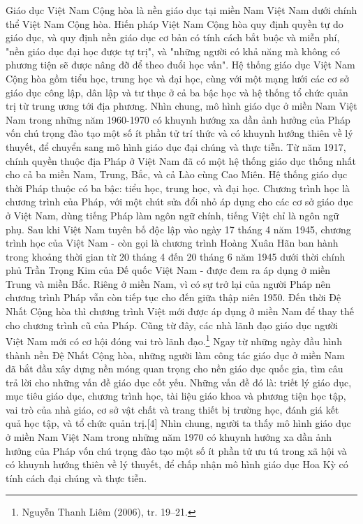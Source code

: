 \documentclass[../thesis.tex]{subfiles}
\begin{document}
Giáo dục Việt Nam Cộng hòa là nền giáo dục tại miền Nam Việt Nam dưới chính thể Việt Nam Cộng hòa.
Hiến pháp Việt Nam Cộng hòa quy định quyền tự do giáo dục, và quy định nền giáo dục cơ bản có tính cách bắt buộc và miễn phí, "nền giáo dục đại học được tự trị", và "những người có khả năng mà không có phương tiện sẽ được nâng đỡ để theo đuổi học vấn". Hệ thống giáo dục Việt Nam Cộng hòa gồm tiểu học, trung học và đại học, cùng với một mạng lưới các cơ sở giáo dục công lập, dân lập và tư thục ở cả ba bậc học và hệ thống tổ chức quản trị từ trung ương tới địa phương.
Nhìn chung, mô hình giáo dục ở miền Nam Việt Nam trong những năm 1960-1970 có khuynh hướng xa dần ảnh hưởng của Pháp vốn chú trọng đào tạo một số ít phần tử trí thức và có khuynh hướng thiên về lý thuyết, để chuyển sang mô hình giáo dục đại chúng và thực tiễn.
Từ năm 1917, chính quyền thuộc địa Pháp ở Việt Nam đã có một hệ thống giáo dục thống nhất cho cả ba miền Nam, Trung, Bắc, và cả Lào cùng Cao Miên. Hệ thống giáo dục thời Pháp thuộc có ba bậc: tiểu học, trung học, và đại học. Chương trình học là chương trình của Pháp, với một chút sửa đổi nhỏ áp dụng cho các cơ sở giáo dục ở Việt Nam, dùng tiếng Pháp làm ngôn ngữ chính, tiếng Việt chỉ là ngôn ngữ phụ. Sau khi Việt Nam tuyên bố độc lập vào ngày 17 tháng 4 năm 1945, chương trình học của Việt Nam - còn gọi là chương trình Hoàng Xuân Hãn ban hành trong khoảng thời gian từ 20 tháng 4 đến 20 tháng 6 năm 1945 dưới thời chính phủ Trần Trọng Kim của Đế quốc Việt Nam - được đem ra áp dụng ở miền Trung và miền Bắc. Riêng ở miền Nam, vì có sự trở lại của người Pháp nên chương trình Pháp vẫn còn tiếp tục cho đến giữa thập niên 1950. Đến thời Đệ Nhất Cộng hòa thì chương trình Việt mới được áp dụng ở miền Nam để thay thế cho chương trình cũ của Pháp. Cũng từ đây, các nhà lãnh đạo giáo dục người Việt Nam mới có cơ hội đóng vai trò lãnh đạo.\footnote{Nguyễn Thanh Liêm (2006), tr. 19–21.}
Ngay từ những ngày đầu hình thành nền Đệ Nhất Cộng hòa, những người làm công tác giáo dục ở miền Nam đã bắt đầu xây dựng nền móng quan trọng cho nền giáo dục quốc gia, tìm câu trả lời cho những vấn đề giáo dục cốt yếu. Những vấn đề đó là: triết lý giáo dục, mục tiêu giáo dục, chương trình học, tài liệu giáo khoa và phương tiện học tập, vai trò của nhà giáo, cơ sở vật chất và trang thiết bị trường học, đánh giá kết quả học tập, và tổ chức quản trị.[4] Nhìn chung, người ta thấy mô hình giáo dục ở miền Nam Việt Nam trong những năm 1970 có khuynh hướng xa dần ảnh hưởng của Pháp vốn chú trọng đào tạo một số ít phần tử ưu tú trong xã hội và có khuynh hướng thiên về lý thuyết, để chấp nhận mô hình giáo dục Hoa Kỳ có tính cách đại chúng và thực tiễn.
\end{document}
